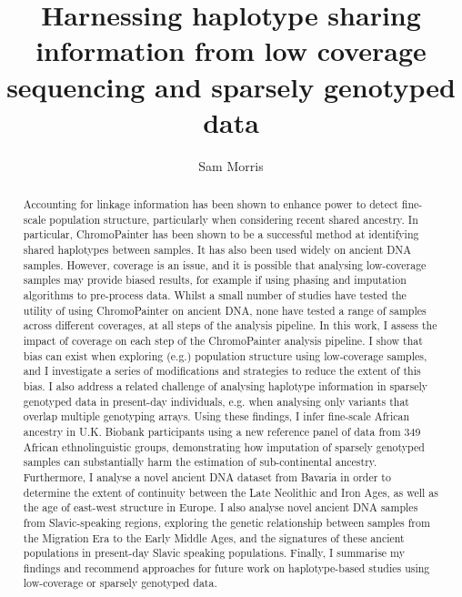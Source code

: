 
\title{Harnessing haplotype sharing information from low coverage sequencing and sparsely genotyped data }
\author{Sam Morris}

\maketitle
\makedeclaration

\begin{abstract} %

Accounting for linkage information has been shown to enhance power to detect fine-scale population structure, particularly when considering recent shared ancestry. In particular, ChromoPainter has been shown to be a successful method at identifying shared haplotypes between samples. It has also been used widely on ancient DNA samples. However, coverage is an issue, and it is possible that analysing low-coverage samples may provide biased results, for example if using phasing and imputation algorithms to pre-process data. Whilst a small number of studies have tested the utility of using ChromoPainter on ancient DNA, none have tested a range of samples across different coverages, at all steps of the analysis pipeline. In this work, I assess the impact of coverage on each step of the ChromoPainter analysis pipeline. I show that bias can exist when exploring (e.g.) population structure using low-coverage samples, and I investigate a series of modifications and strategies to reduce the extent of this bias. I also address a related challenge of analysing haplotype information in sparsely genotyped data in present-day individuals, e.g. when analysing only variants that overlap multiple genotyping arrays. Using these findings, I infer fine-scale African ancestry in U.K. Biobank participants using a new reference panel of data from 349 African ethnolinguistic groups, demonstrating how imputation of sparsely genotyped samples can substantially harm the estimation of sub-continental ancestry. Furthermore, I analyse a novel ancient DNA dataset from Bavaria in order to determine the extent of continuity between the Late Neolithic and Iron Ages, as well as the age of east-west structure in Europe. I also analyse novel ancient DNA samples from Slavic-speaking regions, exploring the genetic relationship between samples from the Migration Era to the Early Middle Ages, and the signatures of these ancient populations in present-day Slavic speaking populations. Finally, I summarise my findings and recommend approaches for future work on haplotype-based studies using low-coverage or sparsely genotyped data. 

\end{abstract}

